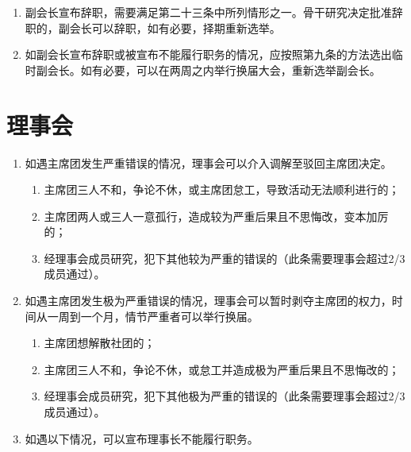 \begin{enumerate}[resume]
    \item 副会长宣布辞职，需要满足第二十三条中所列情形之一。骨干研究决定批准辞职的，副会长可以辞职，如有必要，择期重新选举。
    
    \item 如副会长宣布辞职或被宣布不能履行职务的情况，应按照第九条的方法选出临时副会长。如有必要，可以在两周之内举行换届大会，重新选举副会长。
\end{enumerate}

\section{理事会}


\begin{enumerate}[resume]
    \item 如遇主席团发生严重错误的情况，理事会可以介入调解至驳回主席团决定。
    
    \begin{enumerate}
        \item 主席团三人不和，争论不休，或主席团怠工，导致活动无法顺利进行的；
        \item 主席团两人或三人一意孤行，造成较为严重后果且不思悔改，变本加厉的；
        \item 经理事会成员研究，犯下其他较为严重的错误的（此条需要理事会超过2/3成员通过）。
    \end{enumerate}
    
    \item 如遇主席团发生极为严重错误的情况，理事会可以暂时剥夺主席团的权力，时间从一周到一个月，情节严重者可以举行换届。
    
    \begin{enumerate}
        \item 主席团想解散社团的；
        \item 主席团三人不和，争论不休，或怠工并造成极为严重后果且不思悔改的；
        \item 经理事会成员研究，犯下其他极为严重的错误的（此条需要理事会超过2/3成员通过）。
    \end{enumerate}
    
    \item 如遇以下情况，可以宣布理事长不能履行职务。
    

\end{enumerate}
